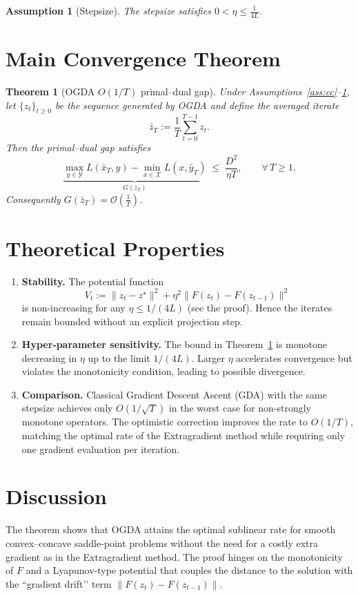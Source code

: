 \documentclass{article}
\newtheorem{theorem}{Theorem}
\newtheorem{assumption}{Assumption}
\begin{document}
\begin{assumption}[Stepsize]\label{ass:stepsize}
The stepsize satisfies $0<\eta\le \frac{1}{4L}$.
\end{assumption}

\section*{Main Convergence Theorem}
\begin{theorem}[OGDA $O(1/T)$ primal–dual gap]\label{thm:ogda}
Under Assumptions~\ref{ass:cc}--\ref{ass:stepsize}, let $\{z_t\}_{t\ge0}$ be the sequence generated by OGDA and define the averaged iterate
\[
\bar z_T:=\frac1T\sum_{t=0}^{T-1}z_t .
\]
Then the \emph{primal–dual gap} satisfies
\[
\underbrace{\max_{y\in\mathcal{Y}}L(\bar x_T,y)-\min_{x\in\mathcal{X}}L(x,\bar y_T)}_{\displaystyle G(\bar z_T)}
\;\le\;
\frac{D^2}{\eta T},
\qquad\forall\,T\ge1 .
\]
Consequently $G(\bar z_T)=\mathcal{O}\!\left(\frac{1}{T}\right)$.
\end{theorem}

\section*{Theoretical Properties}
\begin{enumerate}[label=\arabic*.]
\item \textbf{Stability.} The potential function
\[
V_t:=\|z_t-z^\star\|^2+\eta^2\|F(z_t)-F(z_{t-1})\|^2
\]
is non‑increasing for any $\eta\le 1/(4L)$ (see the proof). Hence the iterates remain bounded without an explicit projection step.
\item \textbf{Hyper‑parameter sensitivity.} The bound in Theorem~\ref{thm:ogda} is monotone decreasing in $\eta$ up to the limit $1/(4L)$. Larger $\eta$ accelerates convergence but violates the monotonicity condition, leading to possible divergence.
\item \textbf{Comparison.} Classical Gradient Descent Ascent (GDA) with the same stepsize achieves only $O(1/\sqrt{T})$ in the worst case for non‑strongly monotone operators. The optimistic correction improves the rate to $O(1/T)$, matching the optimal rate of the Extragradient method while requiring only one gradient evaluation per iteration.
\end{enumerate}

\section*{Discussion}
The theorem shows that OGDA attains the optimal sublinear rate for smooth convex–concave saddle‑point problems without the need for a costly extra gradient as in the Extragradient method. The proof hinges on the monotonicity of $F$ and a Lyapunov‑type potential that couples the distance to the solution with the “gradient drift’’ term $\|F(z_t)-F(z_{t-1})\|$.
\end{document}
